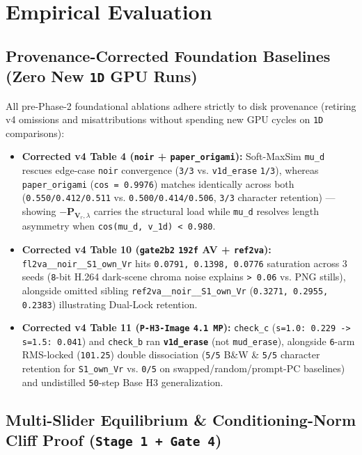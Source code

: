 \documentclass[10pt]{article}
\begin{document}
\section{Empirical Evaluation}

\subsection{Provenance-Corrected Foundation Baselines (Zero New \texttt{1D} GPU Runs)}

All pre-Phase-2 foundational ablations adhere strictly to disk provenance (retiring v4 omissions and misattributions without spending new GPU cycles on \texttt{1D} comparisons):
\begin{itemize}[leftmargin=*]
\item \textbf{Corrected v4 Table 4 (\texttt{noir} + \texttt{paper\_origami}):} Soft-MaxSim \texttt{mu\_d} rescues edge-case \texttt{noir} convergence (\texttt{3/3} vs. \texttt{v1d\_erase} \texttt{1/3}), whereas \texttt{paper\_origami} (\texttt{cos = 0.9976}) matches identically across both (\texttt{0.550/0.412/0.511} vs. \texttt{0.500/0.414/0.506}, \texttt{3/3} character retention) --- showing $-\mathbf{P}_{\mathbf{V}_r,\lambda}$ carries the structural load while \texttt{mu\_d} resolves length asymmetry when \texttt{cos(mu\_d, v\_1d) < 0.980}.
\item \textbf{Corrected v4 Table 10 (\texttt{gate2b2} \texttt{192f} AV + \texttt{ref2va}):} \texttt{fl2va\_\_noir\_\_S1\_own\_Vr} hits \texttt{0.0791, 0.1398, 0.0776} saturation across 3 seeds (\texttt{8}-bit H.264 dark-scene chroma noise explains \texttt{> 0.06} vs. PNG stills), alongside omitted sibling \texttt{ref2va\_\_noir\_\_S1\_own\_Vr} (\texttt{0.3271, 0.2955, 0.2383}) illustrating Dual-Lock retention.
\item \textbf{Corrected v4 Table 11 (\texttt{P-H3-Image} \texttt{4.1 MP}):} \texttt{check\_c} (\texttt{s=1.0: 0.229 -> s=1.5: 0.041}) and \texttt{check\_b} ran \textbf{\texttt{v1d\_erase}} (not \texttt{mud\_erase}), alongside \texttt{6}-arm RMS-locked (\texttt{101.25}) double dissociation (\texttt{5/5} B\&W \& \texttt{5/5} character retention for \texttt{S1\_own\_Vr} vs. \texttt{0/5} on swapped/random/prompt-PC baselines) and undistilled \texttt{50}-step Base H3 generalization.
\end{itemize}

\subsection{Multi-Slider Equilibrium \& Conditioning-Norm Cliff Proof (\texttt{Stage 1 + Gate 4})}
\end{document}
